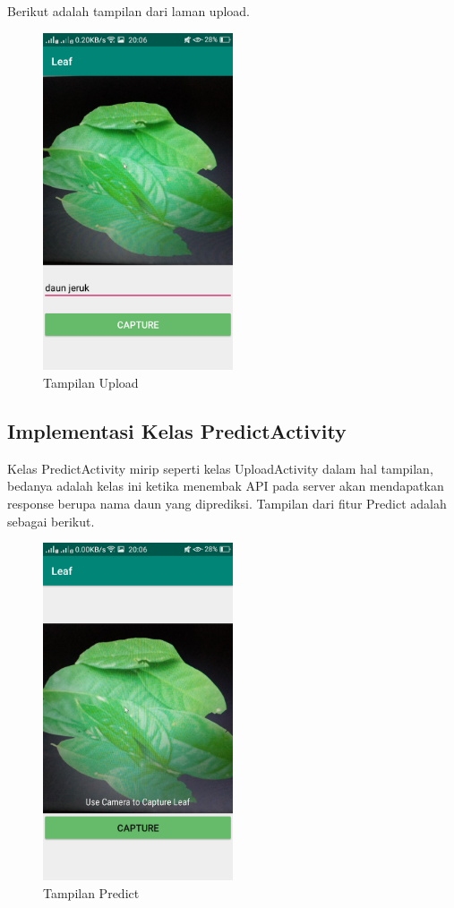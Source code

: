 \par Berikut adalah tampilan dari laman upload.
\begin{figure}[H]
	\centering\includegraphics[width=0.5\textwidth]{bab4/figures/upload.png}
	\caption{Tampilan Upload}
	\label{fig:upload}
\end{figure}
\subsection{Implementasi Kelas PredictActivity}

\par Kelas PredictActivity mirip seperti kelas UploadActivity dalam hal tampilan, bedanya adalah kelas ini ketika menembak API pada server akan mendapatkan response berupa nama daun yang diprediksi. Tampilan dari fitur Predict adalah sebagai berikut.
\begin{figure}[H]
	\centering\includegraphics[width=0.5\textwidth]{bab4/figures/predict.png}
	\caption{Tampilan Predict}
	\label{fig:predict}
\end{figure}
